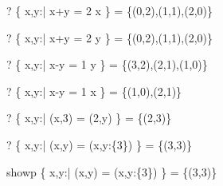 \begin{zed} \vdash?  \{ x,y:\nat | x+y = 2 \land x  \} = \{(0,2),(1,1),(2,0)\} \end{zed}
\begin{zed} \vdash?  \{ x,y:\nat | x+y = 2 \land y  \} = \{(0,2),(1,1),(2,0)\} \end{zed}
\begin{zed} \vdash?  \{ x,y:\nat | x-y = 1  \geq y \} = \{(3,2),(2,1),(1,0)\} \end{zed}
\begin{zed} \vdash?  \{ x,y:\nat | x-y = 1  \geq x \} = \{(1,0),(2,1)\} \end{zed}
\begin{zed} \vdash?  \{ x,y:\nat | (x,3) = (2,y) \} = \{(2,3)\} \end{zed}
\begin{zed} \vdash?  \{ x,y:\nat | (x,y) = (\mu x,y:\{3\}) \} = \{(3,3)\} \end{zed}


showp \{ x,y:\nat | (x,y) = (\mu x,y:\{3\}) \} = \{(3,3)\}

